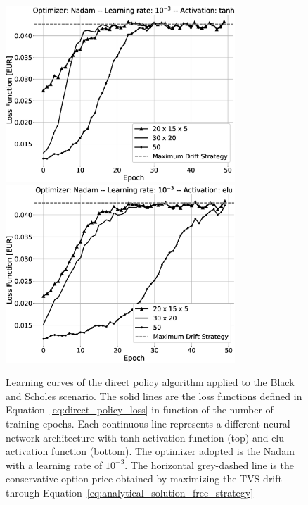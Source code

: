 \documentclass[runningheads]{m2ef}
\newcommand{\change}[1]{{\color{red} {#1}}}%
\begin{document}
	\begin{figure}[h!]
		\centering
		\includegraphics[width=3.4in]{BS_fine_tuning_Nadam_tanh_grey.eps}
		\includegraphics[width=3.4in]{BS_fine_tuning_Nadam_elu_grey.eps}
		\caption{Learning curves of the direct policy algorithm applied to the Black and Scholes \change{scenario}. The solid lines are the loss functions defined in Equation~\eqref{eq:direct_policy_loss} in function of the number of training epochs. Each continuous line represents a different neural network architecture with tanh activation function (top) and elu activation function (bottom). The optimizer adopted is the Nadam with a learning rate of $10^{-3}$. The horizontal grey-dashed line is the conservative option price obtained by maximizing the TVS drift through Equation~\eqref{eq:analytical_solution_free_strategy}}
		\label{fig:result_bs_nadam}
	\end{figure}  
\end{document}
